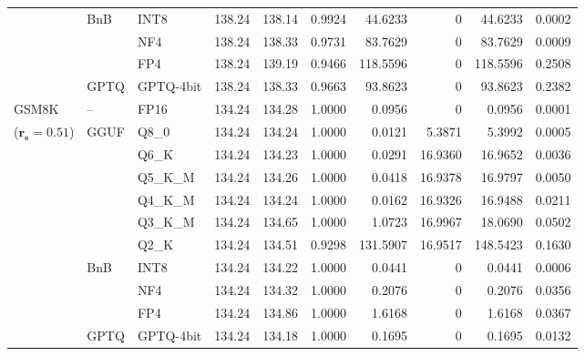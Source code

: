 \begin{longtable}{ll l rrrrrrr}
 & BnB & INT8 & 138.24 & 138.14 & 0.9924 & 44.6233 & \cellcolor{cyan!12} $0$ & 44.6233 & 0.0002 \\
 &  & NF4 & 138.24 & 138.33 & 0.9731 & 83.7629 & \cellcolor{cyan!12} $0$ & 83.7629 & 0.0009 \\
 &  & FP4 & 138.24 & 139.19 & \cellcolor{red!18} 0.9466 & \cellcolor{red!18} 118.5596 & \cellcolor{cyan!12} $0$ & \cellcolor{red!18} 118.5596 & \cellcolor{red!18} 0.2508 \\
 & GPTQ & GPTQ-4bit & 138.24 & 138.33 & 0.9663 & 93.8623 & \cellcolor{cyan!12} $0$ & 93.8623 & 0.2382 \\
\midrule
GSM8K & -- & FP16 & 134.24 & 134.28 & 1.0000 & 0.0956 & \cellcolor{cyan!12} $0$ & 0.0956 & 0.0001 \\
{\small ($\mathbf{r_s{=}0.51}$)} & GGUF & Q8\_0 & 134.24 & 134.24 & 1.0000 & 0.0121 & 5.3871 & 5.3992 & 0.0005 \\
 &  & Q6\_K & 134.24 & 134.23 & 1.0000 & 0.0291 & 16.9360 & 16.9652 & 0.0036 \\
 &  & Q5\_K\_M & 134.24 & 134.26 & 1.0000 & 0.0418 & 16.9378 & 16.9797 & 0.0050 \\
 &  & Q4\_K\_M & 134.24 & 134.24 & 1.0000 & 0.0162 & 16.9326 & 16.9488 & 0.0211 \\
 &  & Q3\_K\_M & 134.24 & 134.65 & 1.0000 & 1.0723 & 16.9967 & 18.0690 & 0.0502 \\
 &  & Q2\_K & 134.24 & 134.51 & \cellcolor{red!18} 0.9298 & \cellcolor{red!18} 131.5907 & 16.9517 & \cellcolor{red!18} 148.5423 & \cellcolor{red!18} 0.1630 \\
 & BnB & INT8 & 134.24 & 134.22 & 1.0000 & 0.0441 & \cellcolor{cyan!12} $0$ & 0.0441 & 0.0006 \\
 &  & NF4 & 134.24 & 134.32 & 1.0000 & 0.2076 & \cellcolor{cyan!12} $0$ & 0.2076 & 0.0356 \\
 &  & FP4 & 134.24 & 134.86 & 1.0000 & 1.6168 & \cellcolor{cyan!12} $0$ & 1.6168 & 0.0367 \\
 & GPTQ & GPTQ-4bit & 134.24 & 134.18 & 1.0000 & 0.1695 & \cellcolor{cyan!12} $0$ & 0.1695 & 0.0132 \\
\end{longtable}
\endgroup